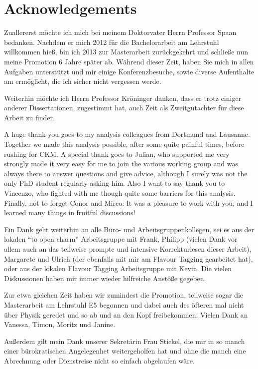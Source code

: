 \chapter{Acknowledgements}

Zuallererst möchte ich mich bei meinem Doktorvater Herrn Professor Spaan bedanken.
Nachdem er mich \num{2012} für die Bachelorarbeit am Lehrstuhl willkommen hieß, bin ich \num{2013} zur Masterarbeit zurückgekehrt und schließe nun meine Promotion \num{6} Jahre später ab.
Während dieser Zeit, haben Sie mich in allen Aufgaben unterstützt und mir einige Konferenzbesuche, sowie diverse Aufenthalte am \cern ermöglicht, die ich sicher nicht vergessen werde.

Weiterhin möchte ich Herrn Professor Kröninger danken, dass er trotz einiger anderer Dissertationen, zugestimmt hat, auch Zeit als Zweitgutachter für diese Arbeit zu finden.

A huge thank-you goes to my analysis colleagues from Dortmund and Lausanne.
Together we made this analysis possible, after some quite painful times, \eg before rushing for CKM.
A special thank goes to Julian, who supported me very strongly made it very easy for me to join the various \lhcb working group and was always there to answer questions and give advice, although I surely was not the only PhD student regularly asking him.
Also I want to say thank you to Vincenzo, who fighted with me though quite some barriers for this analysis.
Finally, not to forget Conor and Mirco: It was a pleasure to work with you, and I learned many things in fruitful discussions!

Ein Dank geht weiterhin an alle Büro- und Arbeitsgruppenkollegen, sei es aus der lokalen \enquote{\B to open charm} Arbeitsgruppe mit Frank, Philipp (vielen Dank vor allem auch an das teilweise prompte und intensive Korrekturlesen dieser Arbeit), Margarete und Ulrich (der ebenfalls mit mir am Flavour Tagging gearbeitet hat), oder aus der lokalen Flavour Tagging Arbeitsgruppe mit Kevin.
Die vielen Diskussionen haben mir immer wieder hilfreiche Anstöße gegeben.

Zur etwa gleichen Zeit haben wir zumindest die Promotion, teilweise sogar die Masterarbeit am Lehrstuhl E5 begonnen und dabei auch des öfteren mal nicht über Physik geredet und so ab und an den Kopf freibekommen: Vielen Dank an Vanessa, Timon, Moritz und Janine.

Außerdem gilt mein Dank unserer Sekretärin Frau Stickel, die mir in so manch einer bürokratischen Angelegenhet weitergeholfen hat und ohne die manch eine Abrechnung oder Dienstreise nicht so einfach abgelaufen wäre.


